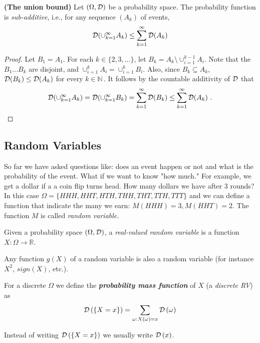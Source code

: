 \documentclass[11pt]{article}
\newcommand{\bN}{\mathbb{N}\,}
\begin{document}
\begin{lemma}  \label{lem:unionBound}  \textbf{(The union bound)} Let
$(\Omega, \mathcal{D})$ be a probability space. The probability function is \emph{sub-additive}, i.e., for any sequence $(A_k)$ of events,
\[
\mathcal{D}(\cup_{k=1}^\infty A_k) \le \sum_{k=1} ^\infty \mathcal{D}(A_k)
\]
\end{lemma}
\begin{proof}
Let $B_1=A_1$. For each $k \in \{2,3,\ldots\}$, let $B_k = A_k
\setminus \cup_{i=1}^{k-1} A_i$. Note that the $B_1...B_k$ are disjoint, and
$\cup_{i=1}^k A_i=\cup_{i=1}^k B_i$. Also, since $B_k\subseteq A_k$, $\mathcal{D}(B_k) \le \mathcal{D}(A_k)$ for every $k \in \bN$. It follows by the countable additivity of $\mathcal{D}$ that
\[
\mathcal{D}(\cup_{k=1}^\infty A_k) = \mathcal{D}(\cup_{k=1}^\infty B_k) = \sum_{k=1}
^\infty \mathcal{D}(B_k) \le \sum_{k=1}
^\infty \mathcal{D}(A_k)~. 
\]
\end{proof} 




\subsection{Random Variables}

So far we have asked questions like: does an event happen or not and what is the probability of the event. What if we want to know "how much." For example, we get a dollar if a a coin flip turns head. How many dollars we have after 3 rounds? In this case $\Omega=\{HHH,HHT,HTH,THH,THT,TTH,TTT\}$ and we can define a function that indicate the many we earn: $M(HHH)=3,M(HHT)=2.$ The function $M$ is called \emph{random variable.}
\begin{definition}
Given a probability space $\left(\Omega,\mathcal{D}\right)$, a \textit{real-valued
random variable} is a function $X:\Omega\rightarrow\mathbb{R}$.

\end{definition}
\begin{remark}
Any function $g\left(X\right)$ of a random variable is also a random
variable (for instance $X^{2}$, $sign\left(X\right)$, etc.).
\end{remark}
For a discrete $\Omega$ we define the \textbf{\textit{probability
mass function}} of $X$ (a \textit{discrete RV}) as 
\[
\mathcal{D}\left(\left\{ X=x\right\} \right)=\sum_{\omega:X\left(\omega\right)=x}\mathcal{D}\left(\omega\right)
\]


Instead of writing $\mathcal{D}\left(\left\{ X=x\right\} \right)$ we usually
write $\mathcal{D}\left(x\right)$.
\end{document}
